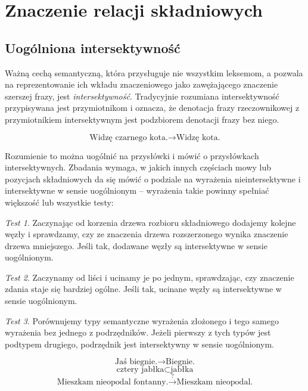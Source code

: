 \documentclass[a4paper, 12pt]{article}
\theoremstyle{remark}
\newtheorem{test}{Test}
\begin{document}
\section{Znaczenie relacji składniowych} %

\subsection{Uogólniona intersektywność} %
\label{uog_interektywnosc}
Ważną cechą semantyczną, która przysługuje nie wszystkim leksemom, a pozwala na reprezentowanie ich wkładu znaczeniowego jako zawężającego znaczenie szerszej frazy, jest \emph{intersektywność}.
Tradycyjnie rozumiana intersektywność przypisywana jest przymiotnikom i oznacza, że denotacja frazy rzeczownikowej z przymiotnikiem intersektywnym jest podzbiorem denotacji frazy bez niego.

\begin{equation}
\text{Widzę czarnego kota.} \rightarrow \text{Widzę kota.}
\end{equation}


Rozumienie to można uogólnić na przysłówki i mówić o przysłówkach intersektywnych. Zbadania wymaga, w jakich innych częściach mowy lub pozycjach składniowych da się mówić o podziale na wyrażenia nieintersektywne i intersektywne w sensie uogólnionym -- wyrażenia takie powinny spełniać większość lub wszystkie testy:
\begin{test}
Zaczynając od korzenia drzewa rozbioru składniowego dodajemy kolejne węzły i sprawdzamy, czy ze znaczenia drzewa rozszerzonego wynika znaczenie drzewa mniejszego. Jeśli tak, dodawane węzły są intersektywne w sensie uogólnionym.
\end{test}
\begin{test}
Zaczynamy od liści i ucinamy je po jednym, sprawdzając, czy znaczenie zdania staje się bardziej ogólne. Jeśli tak, ucinane węzły są intersektywne w sensie uogólnionym.
\end{test}
\begin{test}
Porównujemy typy semantyczne wyrażenia złożonego i tego samego wyrażenia bez jednego z podrzędników. Jeżeli pierwszy z tych typów jest podtypem drugiego, podrzędnik jest intersektywny w sensie uogólnionym.
\end{test}
\begin{equation}\label{biegnie}
	\text{Jaś biegnie.} \rightarrow \text{Biegnie.}
\end{equation}
\begin{equation}\label{jablka}
	\text{cztery jabłka} \subset \text{jabłka}
\end{equation}
\begin{equation}\label{fontanna}
\text{Mieszkam nieopodal fontanny.} \stackrel{?}{\rightarrow} \text{Mieszkam nieopodal.}
\end{equation}
\end{document}
